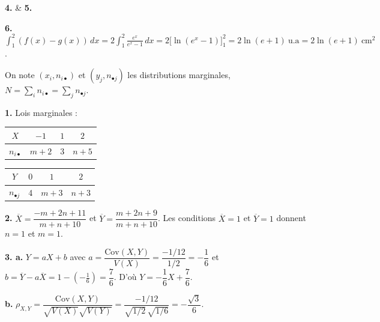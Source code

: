 \documentclass[11pt]{article}
\begin{document}
\textbf{4.} \& \textbf{5.}
\begin{center}
\end{center}

\textbf{6.} $\displaystyle\int_1^2 (f(x) - g(x))\,dx = 2\int_1^2 \frac{e^x}{e^x - 1}\,dx = 2\big[\ln(e^x - 1)\big]_1^2 = 2\ln(e + 1)\ \text{u.a} = 2\ln(e+1)\ \text{cm}^2$.

On note $(x_i, n_{i\bullet})$ et $(y_j, n_{\bullet j})$ les distributions marginales, $N = \sum_i n_{i\bullet} = \sum_j n_{\bullet j}$.

\textbf{1.} Lois marginales :
\begin{center}\renewcommand{\arraystretch}{1.3}
\begin{tabular}{|c|c|c|c|}\hline $X$ & $-1$ & $1$ & $2$ \\\hline $n_{i\bullet}$ & $m+2$ & 3 & $n+5$ \\\hline\end{tabular}\qquad
\begin{tabular}{|c|c|c|c|}\hline $Y$ & $0$ & $1$ & $2$ \\\hline $n_{\bullet j}$ & 4 & $m+3$ & $n+3$ \\\hline\end{tabular}
\end{center}

\textbf{2.} $\overline{X} = \dfrac{-m + 2n + 11}{m + n + 10}$ et $\overline{Y} = \dfrac{m + 2n + 9}{m + n + 10}$. Les conditions $\overline{X} = 1$ et $\overline{Y} = 1$ donnent $n = 1$ et $m = 1$.

\textbf{3. a.} $Y = aX + b$ avec $a = \dfrac{\mathrm{Cov}(X,Y)}{V(X)} = \dfrac{-1/12}{1/2} = -\dfrac{1}{6}$ et $b = \overline{Y} - a\overline{X} = 1 - \left(-\tfrac{1}{6}\right) = \dfrac{7}{6}$. D'où $Y = -\dfrac{1}{6}X + \dfrac{7}{6}$.

\textbf{b.} $\rho_{X,Y} = \dfrac{\mathrm{Cov}(X,Y)}{\sqrt{V(X)}\sqrt{V(Y)}} = \dfrac{-1/12}{\sqrt{1/2}\,\sqrt{1/6}} = -\dfrac{\sqrt{3}}{6}$.
\end{document}
